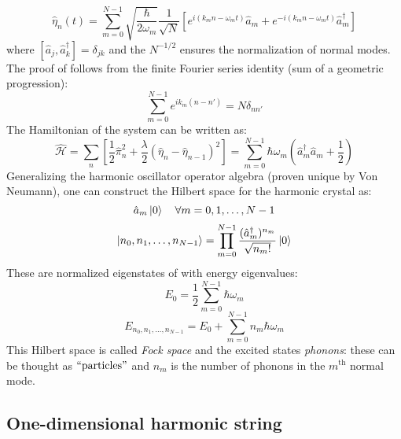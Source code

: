 \begin{equation}
  \hat{\eta}_n(t) = \sum_{m = 0}^{N - 1} \sqrt{\frac{\hbar}{2 \omega_m}} \frac{1}{\sqrt{N}} \left[ e^{i \left( k_m n - \omega_m t \right)} \hat{a}_m + e^{-i \left( k_m n - \omega_m t \right)} \hat{a}_m^\dagger \right]
  \label{eq:first-quant}
\end{equation}
where $ [ \hat{a}_j, \hat{a}_k^\dagger ] = \delta_{jk} $ and the $ N^{-1/2} $ ensures the normalization of normal modes. The proof of  follows from the finite Fourier series identity (sum of a geometric progression):
\begin{equation}
  \sum_{m = 0}^{N - 1} e^{i k_m \left( n - n' \right)} = N \delta_{n n'}
  \label{eq:first-id}
\end{equation}
The Hamiltonian of the system can be written as:
\begin{equation}
  \hat{\mathcal{H}} = \sum_{n} \left[ \frac{1}{2} \hat{\pi}_n^2 + \frac{\lambda}{2} \left( \hat{\eta}_n - \hat{\eta}_{n-1} \right)^2 \right] = \sum_{m = 0}^{N - 1} \hbar \omega_m \left( \hat{a}_m^\dagger \hat{a}_m + \frac{1}{2} \right)
\end{equation}
Generalizing the harmonic oscillator operator algebra (proven unique by Von Neumann), one can construct the Hilbert space for the harmonic crystal as:
\begin{equation}
  \hat{a}_m \ket{0} \quad \forall m = 0, 1, \dots, N - 1
\end{equation}
\begin{equation}
  \ket{n_0, n_1, \dots, n_{N-1}} = \prod_{m = 0}^{N - 1} \frac{( \hat{a}_m^\dagger )^{n_m}}{\sqrt{n_m!}} \ket{0}
\end{equation}
These are normalized eigenstates of  with energy eigenvalues:
\begin{equation}
  E_0 = \frac{1}{2} \sum_{m = 0}^{N - 1} \hbar \omega_m
  \label{eq:first-harm}
\end{equation}
\begin{equation}
  E_{n_0, n_1, \dots, n_{N-1}} = E_0 + \sum_{m = 0}^{N - 1} n_m \hbar \omega_m
\end{equation}
This Hilbert space is called \textit{Fock space} and the excited states \textit{phonons}: these can be thought as $ ``\text{particles}" $ and $ n_m $ is the number of phonons in the $ m^{\mathrm{th}} $ normal mode.

\subsection{One-dimensional harmonic string}

